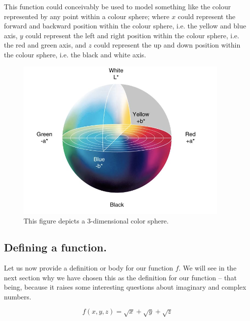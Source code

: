 \documentclass{article}
\begin{document}
This function could conceivably be used to model something like the colour represented by any point within a 
colour sphere; where \begin{math} x \end{math} could represent the forward and backward position within the
colour sphere, i.e. the yellow and blue axis, \begin{math} y \end{math} could represent the left and right position
within the colour sphere, i.e. the red and green axis, and \begin{math} z \end{math} could represent the up and down
position within the colour sphere, i.e. the black and white axis.

\newpage

\begin{figure}
  \includegraphics[scale=0.75]{images/Color_sphere.png}
  \caption{This figure depicts a 3-dimensional color sphere.}
  \label{fig:Color_sphere}
\end{figure}


\subsection{Defining a function.}

Let us now provide a definition or body for our function \begin{math} f \end{math}. We will see in the next section
why we have chosen this as the definition for our function -- that being, because it raises some interesting questions
about imaginary and complex numbers.

\begin{equation}
  f(x,y,z) = \sqrt{x} + \sqrt{y} + \sqrt{z}
\end{equation}
\end{document}
